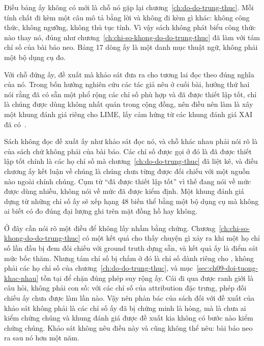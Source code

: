 Điều bảng ấy không có mới là chỗ nó gặp lại chương~\ref{ch:do-do-trung-thuc}.
Mỗi tính chất đi kèm một câu mô tả bằng lời và không đi kèm gì khác: không công
thức, không ngưỡng, không thủ tục tính. Vì vậy sách không phát biểu công thức
nào thay nó, đúng như chương~\ref{ch:chi-so-khong-do-do-trung-thuc} đã làm với
tám chỉ số của bài báo neo. Bảng 17 dòng ấy là một danh mục thuật ngữ, không phải
một bộ dụng cụ đo.

Với chỗ đứng ấy, đề xuất mà khảo sát đưa ra cho tương lai đọc theo đúng nghĩa
của nó. Trong bốn hướng nghiên cứu các tác giả nêu ở cuối bài, hướng thứ hai nói
rằng đã có sẵn một phổ rộng các chỉ số phù hợp và đã được thiết lập tốt, chỉ
là chúng được dùng không nhất quán trong cộng đồng, nên điều nên làm là xây một
khung đánh giá riêng cho LIME, lấy cảm hứng từ các khung đánh giá XAI đã
có~\autocite{p22whichlime}.

Sách không đọc đề xuất ấy như khảo sát đọc nó, và chỗ khác nhau phải nói rõ là
của sách chứ không phải của bài báo. Các chỉ số được gọi ở đó là đã được thiết
lập tốt chính là các họ chỉ số mà chương~\ref{ch:do-do-trung-thuc} đã liệt kê,
và điều chương ấy kết luận về chúng là chúng chưa từng được đối chiếu với một
nguồn nào ngoài chính chúng. Cụm từ \enquote{đã được thiết lập tốt} vì thế đang
nói về mức được dùng nhiều, không nói về mức đã được kiểm định. Một khung đánh
giá dựng từ những chỉ số ấy sẽ xếp hạng 48 biến thể bằng một bộ dụng cụ mà
không ai biết có đo đúng đại lượng ghi trên mặt đồng hồ hay không.

Ở đây cần nói rõ một điều để không lấy nhầm bằng chứng.
Chương~\ref{ch:chi-so-khong-do-do-trung-thuc} có một kết quả cho thấy chuyện gì
xảy ra khi một họ chỉ số lần đầu bị đem đối chiếu với ground truth dựng sẵn, và
kết quả ấy là điểm sát mức bốc thăm. Nhưng tám chỉ số bị chấm ở đó là chỉ số
dành riêng cho , không phải các họ chỉ số của
chương~\ref{ch:do-do-trung-thuc}, và mục~\ref{sec:ch09-doi-tuong-khac-nhau} tồn
tại để chặn đúng phép suy rộng ấy. Cái đi qua được ranh giới là câu hỏi, không
phải con số: với các chỉ số của attribution đặc trưng, phép đối chiếu ấy chưa
được làm lần nào. Vậy nên phản bác của sách đối với đề xuất của khảo sát không
phải là các chỉ số ấy đã bị chứng minh là hỏng, mà là chưa ai kiểm chứng chúng
và khung đánh giá được đề xuất kia không có bước nào kiểm chứng chúng. Khảo sát
không nêu điều này và cũng không thể nêu: bài báo neo ra sau nó hơn một năm.
